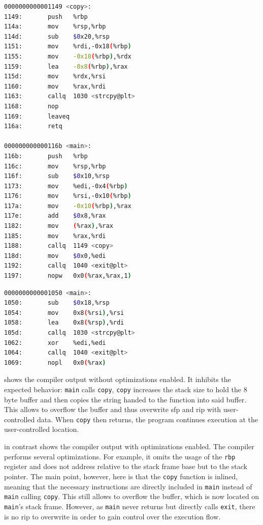 \begin{lstlisting}[language=bash,float=ht,caption={Disassembly excerpt of the 64 bit binary compiled from the code in \cref{lst:optimization} with \texttt{gcc -o copy optimization.c -fno-stack-protector}, retrieved with \texttt{objdump -D -{}-no-show-raw-insn copy}}, label={lst:optimization-disassembly}]
0000000000001149 <copy>:
1149:       push   %rbp
114a:       mov    %rsp,%rbp
114d:       sub    $0x20,%rsp
1151:       mov    %rdi,-0x18(%rbp)
1155:       mov    -0x18(%rbp),%rdx
1159:       lea    -0x8(%rbp),%rax
115d:       mov    %rdx,%rsi
1160:       mov    %rax,%rdi
1163:       callq  1030 <strcpy@plt>
1168:       nop
1169:       leaveq
116a:       retq

000000000000116b <main>:
116b:       push   %rbp
116c:       mov    %rsp,%rbp
116f:       sub    $0x10,%rsp
1173:       mov    %edi,-0x4(%rbp)
1176:       mov    %rsi,-0x10(%rbp)
117a:       mov    -0x10(%rbp),%rax
117e:       add    $0x8,%rax
1182:       mov    (%rax),%rax
1185:       mov    %rax,%rdi
1188:       callq  1149 <copy>
118d:       mov    $0x0,%edi
1192:       callq  1040 <exit@plt>
1197:       nopw   0x0(%rax,%rax,1)
\end{lstlisting}

\begin{lstlisting}[language=bash,float=ht,caption={Disassembly excerpt of the 64 bit binary compiled from the code in \cref{lst:optimization} with \texttt{gcc -o copy optimization.c -fno-stack-protector -O3}, retrieved with \texttt{objdump -D -{}-no-show-raw-insn copy}}, label={lst:optimization-disassembly-optimized}]
0000000000001050 <main>:
1050:       sub    $0x18,%rsp
1054:       mov    0x8(%rsi),%rsi
1058:       lea    0x8(%rsp),%rdi
105d:       callq  1030 <strcpy@plt>
1062:       xor    %edi,%edi
1064:       callq  1040 <exit@plt>
1069:       nopl   0x0(%rax)
\end{lstlisting}

 shows the compiler output without optimizations enabled.
It inhibits the expected behavior: \texttt{main} calls \texttt{copy}, \texttt{copy} increases the stack size to hold the 8 byte buffer and then copies the string handed to the function into said buffer.
This allows to overflow the buffer and thus overwrite \gls{sfp} and \gls{rip} with user-controlled data.
When \texttt{copy} then returns, the program continues execution at the user-controlled location.

 in contrast shows the compiler output with optimizations enabled.
The compiler performs several optimizations.
For example, it omits the usage of the \texttt{rbp} register and does not address relative to the stack frame base but to the stack pointer.
The main point, however, here is that the \texttt{copy} function is inlined, meaning that the necessary instructions are directly included in \texttt{main} instead of \texttt{main} calling \texttt{copy}.
This still allows to overflow the buffer, which is now located on \texttt{main}'s stack frame.
However, as \texttt{main} never returns but directly calls \texttt{exit}, there is no \gls{rip} to overwrite in order to gain control over the execution flow.

